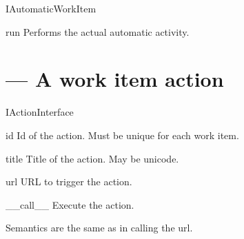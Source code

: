 
    \begin{classdesc}{IAutomaticWorkItem}{}
        
        \begin{funcdesc}{run}{}
            Performs the actual automatic activity.
        \end{funcdesc}
    
    \end{classdesc}

\section{ --- A work item action}

    \begin{classdesc}{IAction}{Interface}

        \begin{memberdesc}{id}
            Id of the action. Must be unique for each work item.
        \end{memberdesc}

        \begin{memberdesc}{title}
            Title of the action. May be unicode.
        \end{memberdesc}

        \begin{memberdesc}{url}
            URL to trigger the action.
        \end{memberdesc}

        \begin{funcdesc}{__call__}{}
            Execute the action.

            Semantics are the same as in calling the url.
        \end{funcdesc}
    \end{classdesc}
